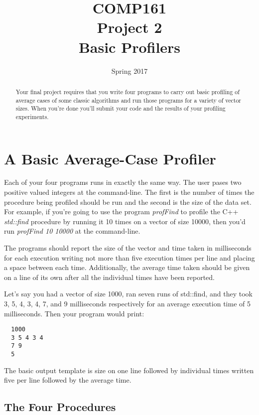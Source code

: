 \documentclass[]{tufte-handout}
\title{COMP161 \\ Project 2 \\ Basic Profilers}
\author{}
\date{Spring 2017}
\begin{document}
\maketitle

\begin{abstract}
Your final project requires that you write four programs to carry out basic profiling of average cases of some classic algorithms and run those programs for a variety of vector sizes. When you're done you'll submit your code and the results of your profiling experiments.
\end{abstract}

\section{A Basic Average-Case Profiler}

Each of your four programs runs in exactly the same way.  The user pases two positive valued integers at the command-line. The first is the number of times the procedure being profiled should be run and the second is the size of the data set.  For example, if you're going to use the program \textit{profFind} to profile the C++ \textit{std::find} procedure by running it 10 times on a vector of size 10000, then you'd run \textit{profFind 10 10000} at the command-line.

The programs should report the size of the vector and time taken in milliseconds for each execution writing not more than five execution times per line and placing a space between each time. Additionally, the average time taken should be given on a line of its own after all the individual times have been reported.

Let's say you had a vector of size 1000, ran seven runs of std::find, and they took 3, 5, 4, 3, 4, 7, and 9 milliseconds respectively for an average execution time of 5 milliseconds. Then your program would print:

\begin{verbatim}
  1000
  3 5 4 3 4
  7 9
  5
\end{verbatim}

The basic output template is size on one line followed by individual times written five per line followed by the average time.

\subsection{ The Four Procedures }
\end{document}
